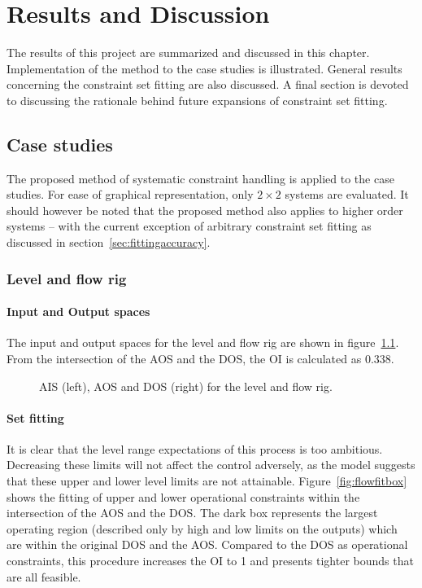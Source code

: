 \chapter{Results and Discussion}\label{chap:results}
\begin{overview}
  The results of this project are summarized and discussed in this chapter.
  Implementation of the method to the case studies is illustrated.
  General results concerning the constraint set fitting are also discussed.
  A final section is devoted to discussing the rationale behind future expansions of constraint set fitting.
\end{overview}

\section{Case studies}
The proposed method of systematic constraint handling is applied to the case studies.
For ease of graphical representation, only $2\times2$ systems are evaluated.
It should however be noted that the proposed method also applies to higher order systems -- with the current exception of arbitrary constraint set fitting as discussed in section~\ref{sec:fittingaccuracy}.

\subsection{Level and flow rig}

\subsubsection{Input and Output spaces}
The input and output spaces for the level and flow rig are shown in figure~\ref{fig:flowaisaos}.
From the intersection of the AOS and the DOS, the OI is calculated as 0.338.

\begin{figure}[htbp]
  \centering
    \scalebox{1}{}  
    \scalebox{1}{}  
  \caption[AIS, AOS and DOS of the level and flow rig]{AIS (left), AOS and DOS (right) for the level and flow rig.}
  \label{fig:flowaisaos}
\end{figure}

\subsubsection{Set fitting}
It is clear that the level range expectations of this process is too ambitious.
Decreasing these limits will not affect the control adversely, as the model suggests that these upper and lower level limits are not attainable.
Figure~\ref{fig:flowfitbox} shows the fitting of upper and lower operational constraints within the intersection of the AOS and the DOS.
The dark box represents the largest operating region (described only by high and low limits on the outputs) which are within the original DOS and the AOS.
Compared to the DOS as operational constraints, this procedure increases the OI to 1 and presents tighter bounds that are all feasible.

